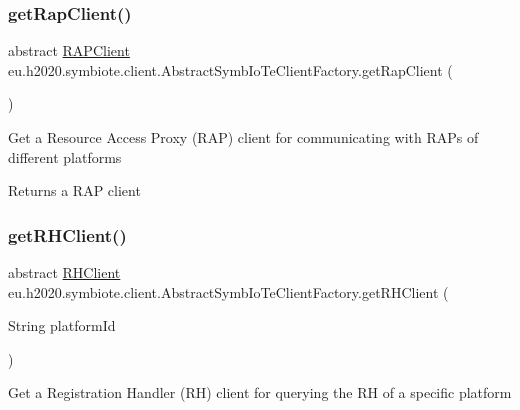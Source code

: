 \subsubsection{\texorpdfstring{get\+Rap\+Client()}{getRapClient()}}
{\footnotesize\ttfamily abstract \hyperlink{interfaceeu_1_1h2020_1_1symbiote_1_1client_1_1interfaces_1_1RAPClient}{R\+A\+P\+Client} eu.\+h2020.\+symbiote.\+client.\+Abstract\+Symb\+Io\+Te\+Client\+Factory.\+get\+Rap\+Client (\begin{DoxyParamCaption}{ }\end{DoxyParamCaption})\hspace{0.3cm}{\ttfamily [abstract]}}

Get a Resource Access Proxy (R\+AP) client for communicating with R\+A\+Ps of different platforms

\begin{DoxyReturn}{Returns}
a R\+AP client 
\end{DoxyReturn}
\mbox{\label{classeu_1_1h2020_1_1symbiote_1_1client_1_1AbstractSymbIoTeClientFactory_ae2df2c1d0b1e92fb7aee36ad8269cb37}} 
\subsubsection{\texorpdfstring{get\+R\+H\+Client()}{getRHClient()}}
{\footnotesize\ttfamily abstract \hyperlink{interfaceeu_1_1h2020_1_1symbiote_1_1client_1_1interfaces_1_1RHClient}{R\+H\+Client} eu.\+h2020.\+symbiote.\+client.\+Abstract\+Symb\+Io\+Te\+Client\+Factory.\+get\+R\+H\+Client (\begin{DoxyParamCaption}\item[{String}]{platform\+Id }\end{DoxyParamCaption})\hspace{0.3cm}{\ttfamily [abstract]}}

Get a Registration Handler (RH) client for querying the RH of a specific platform



